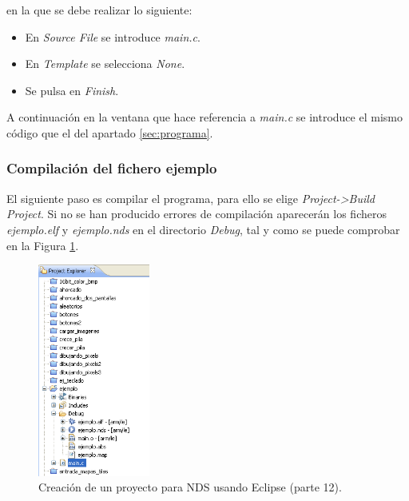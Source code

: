 \noindent en la que se debe realizar lo siguiente:
\begin{itemize}
 	\item En \textit{Source File} se introduce \textit{main.c}.
 	\item En \textit{Template} se selecciona \textit{None}.
 	\item Se pulsa en \textit{Finish}.
\end{itemize}

A continuación en la ventana que hace referencia a \textit{main.c} se introduce el mismo código que el del apartado \ref{sec:programa}.

\subsubsection{Compilación del fichero ejemplo}
El siguiente paso es compilar el programa, para ello se elige \textit{Project->Build Project}. Si no se han producido errores de compilación aparecerán los ficheros  \textit{ejemplo.elf} y \textit{ejemplo.nds} en el directorio \textit{Debug}, tal y como se puede comprobar en la Figura \ref{fig_c2_ficheros_eclipse}.

\begin{figure}[t]
	\centering
	\includegraphics[height=7cm]{./Figuras/C2/c2_ficheros_eclipse.png}
	\caption{Creación de un proyecto para NDS usando Eclipse  (parte 12).}
	\label{fig_c2_ficheros_eclipse}
\end{figure}

